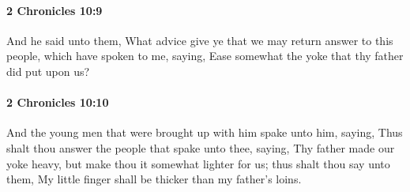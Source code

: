 		\paragraph{2 Chronicles 10:9} %
			\label{2CHRONICLES-10-9}

			And he said unto them, What advice give ye that we may return answer to this people, which have spoken to me, saying, Ease somewhat the yoke that thy father did put upon us?


		\paragraph{2 Chronicles 10:10} %
			\label{2CHRONICLES-10-10}

			And the young men that were brought up with him spake unto him, saying, Thus shalt thou answer the people that spake unto thee, saying, Thy father made our yoke heavy, but make thou it somewhat lighter for us; thus shalt thou say unto them, My little finger shall be thicker than my father's loins.


